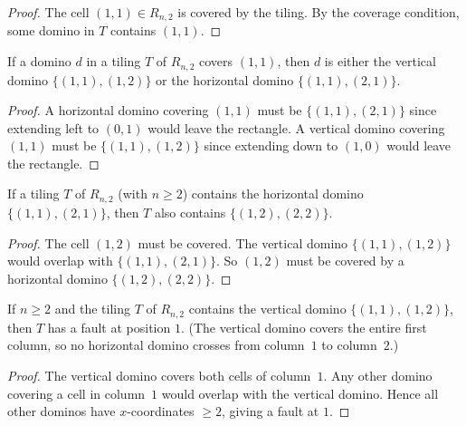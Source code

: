 \begin{proof}
The cell $(1,1) \in R_{n,2}$ is covered by the tiling. By the coverage
condition, some domino in $T$ contains $(1,1)$.
\end{proof}

\begin{lemma}
\label{lem.gf-ws.domino-covering-11-valid}
If a domino $d$ in a tiling $T$ of $R_{n,2}$ covers $(1,1)$, then $d$ is
either the vertical domino $\{(1,1),(1,2)\}$ or the horizontal domino
$\{(1,1),(2,1)\}$.
\end{lemma}

\begin{proof}
A horizontal domino covering $(1,1)$ must be $\{(1,1),(2,1)\}$ since
extending left to $(0,1)$ would leave the rectangle. A vertical domino
covering $(1,1)$ must be $\{(1,1),(1,2)\}$ since extending down to $(1,0)$
would leave the rectangle.
\end{proof}

\begin{lemma}
\label{lem.gf-ws.horizontal-12-if-horizontal-11}
\leanhelper
\leanok
If a tiling $T$ of $R_{n,2}$ (with $n \ge 2$) contains the horizontal domino
$\{(1,1),(2,1)\}$, then $T$ also contains $\{(1,2),(2,2)\}$.
\end{lemma}

\begin{proof}
The cell $(1,2)$ must be covered. The vertical domino $\{(1,1),(1,2)\}$
would overlap with $\{(1,1),(2,1)\}$. So $(1,2)$ must be covered by a
horizontal domino $\{(1,2),(2,2)\}$.
\end{proof}

\begin{lemma}
\label{lem.gf-ws.fault-at-1-if-vertical}
\leanhelper
\leanok
If $n \ge 2$ and the tiling $T$ of $R_{n,2}$ contains the vertical domino
$\{(1,1),(1,2)\}$, then $T$ has a fault at position $1$. (The vertical domino
covers the entire first column, so no horizontal domino crosses from column~$1$
to column~$2$.)
\end{lemma}

\begin{proof}
The vertical domino covers both cells of column~$1$. Any other domino
covering a cell in column~$1$ would overlap with the vertical domino.
Hence all other dominos have $x$-coordinates $\ge 2$, giving a fault at $1$.
\end{proof}

